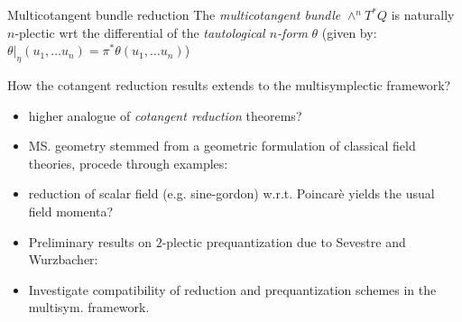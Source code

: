 \documentclass[handout,10pt]{beamer}
\begin{document}
\begin{frame}{Multicotangent bundle reduction}
			\alert{ The	\emph{multicotangent bundle} $\wedge^n T^\ast Q$ 	is naturally $n$-plectic wrt the differential of the \emph{tautological $n$-form} $\theta$ }
				\tiny \color{gray}
				(given by: $\theta \big\vert_\eta (u_1,\dots u_n) =  \pi^\ast \theta (u_1,\dots u_n)$)
				
	
	\vfill
	\pause
	\begin{probox}[colbacktitle=yellow!15!white ,colback=yellow!15!white]{ How the cotangent reduction results extends to the multisymplectic framework?}
		\begin{itemize}

			\item[\smark] higher analogue of \emph{cotangent reduction} theorems?
			\item[\cmark] MS. geometry stemmed from a geometric formulation of classical field theories, procede through examples: 
			\item[\smark] reduction of scalar field (e.g. sine-gordon) w.r.t. Poincarè yields the usual field momenta?
			\item[\cmark] Preliminary results on $2$-plectic prequantization due to Sevestre and Wurzbacher:
			\item[\smark] Investigate compatibility of reduction and prequantization schemes in the multisym. framework.
		\end{itemize}
	\end{probox}	

\end{frame}


\end{document}
